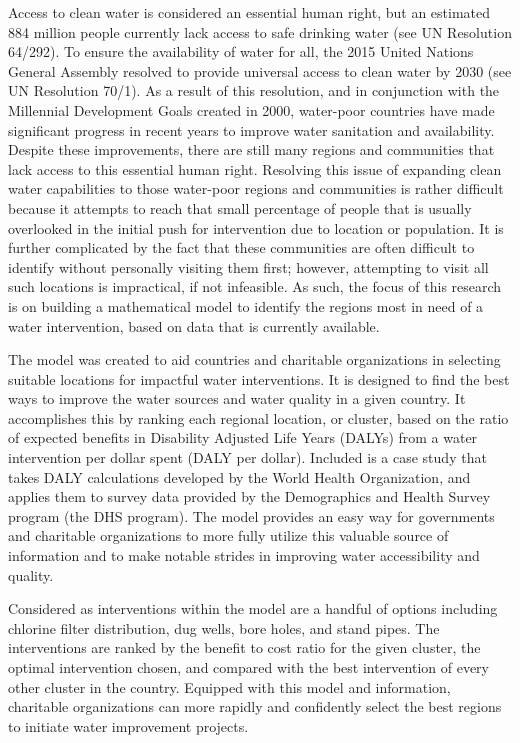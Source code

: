 Access to clean water is considered an essential human right, but an estimated 884 million people currently lack access to safe drinking water (see UN Resolution 64/292).
To ensure the availability of water for all, the 2015 United Nations General Assembly resolved to provide universal access to clean water by 2030 (see UN Resolution 70/1).
As a result of this resolution, and in conjunction with the Millennial Development Goals created in 2000, water-poor countries have made significant progress in recent years to improve water sanitation and availability.
Despite these improvements, there are still many regions and communities that lack access to this essential human right.
Resolving this issue of expanding clean water capabilities to those water-poor regions and communities is rather difficult because it attempts to reach that small percentage of people that is usually overlooked in the initial push for intervention due to location or population.
It is further complicated by the fact that these communities are often difficult to identify without personally visiting them first; however, attempting to visit all such locations is impractical, if not infeasible.
As such, the focus of this research is on building a mathematical model to identify the regions most in need of a water intervention, based on data that is currently available. 

The model was created to aid countries and charitable organizations in selecting suitable locations for impactful water interventions.
It is designed to find the best ways to improve the water sources and water quality in a given country.
It accomplishes this by ranking each regional location, or cluster, based on the ratio of expected benefits in Disability Adjusted Life Years (DALYs) from a water intervention per dollar spent (DALY per dollar).
Included is a case study that takes DALY calculations developed by the World Health Organization, and applies them to survey data provided by the Demographics and Health Survey program (the DHS program).
The model provides an easy way for governments and charitable organizations to more fully utilize this valuable source of information and to make notable strides in improving water accessibility and quality.

Considered as interventions within the model are a handful of options including chlorine filter distribution, dug wells, bore holes, and stand pipes.
The interventions are ranked by the benefit to cost ratio for the given cluster, the optimal intervention chosen, and compared with the best intervention of every other cluster in the country.
Equipped with this model and information, charitable organizations can more rapidly and confidently select the best regions to initiate water improvement projects.

